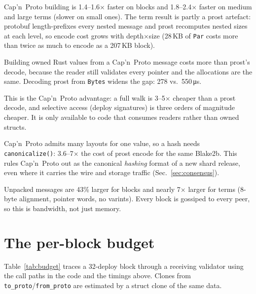 \documentclass[10pt,a4paper]{article}
\newcommand{\f}[1]{\nolinkurl{#1}}
\newcommand{\capnp}{Cap'n~Proto}
\begin{document}
\begin{description}[style=nextline,leftmargin=0pt,font=\sffamily\bfseries\small]
\item[Encoding] \capnp{} building is 1.4--1.6$\times$ faster on blocks and 1.8--2.4$\times$
  faster on medium and large terms (slower on small ones). The term result is partly a prost
  artefact: protobuf length-prefixes every nested message and prost recomputes nested sizes at
  each level, so encode cost grows with depth$\times$size (28\,KB of \f{Par} costs more than twice
  as much to encode as a 207\,KB block).
\item[Owned decode] Building owned Rust values from a \capnp{} message costs more than prost's
  decode, because the reader still validates every pointer and the allocations are the same.
  Decoding prost from \f{Bytes} widens the gap: 278 vs.\ 550\,\si{\micro\second}.
\item[In-place reads] This is the \capnp{} advantage: a full walk is 3--5$\times$ cheaper than a
  prost decode, and selective access (deploy signatures) is three orders of magnitude cheaper. It
  is only available to code that consumes readers rather than owned structs.
\item[Hash inputs] \capnp{} admits many layouts for one value, so a hash needs
  \f{canonicalize()}: 3.6--7$\times$ the cost of prost encode for the same Blake2b. This rules
  \capnp{} out as the canonical \emph{hashing} format of a new shard release, even where it carries
  the wire and storage traffic (Sec.~\ref{sec:consensus}).
\item[Size] Unpacked messages are 43\% larger for blocks and nearly 7$\times$ larger for terms (8-byte
  alignment, pointer words, no varints). Every block is gossiped to every peer, so this is
  bandwidth, not just memory.
\end{description}

\section{The per-block budget}\label{sec:budget}

Table~\ref{tab:budget} traces a 32-deploy block through a receiving validator using the call
paths in the code and the timings above. Clones from \f{to_proto}/\f{from_proto} are estimated
by a struct clone of the same data.
\end{document}

